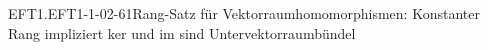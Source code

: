 \begin{PROP}{EFT1.EFT1-1-02-61}{Rang-Satz für Vektorraumhomomorphismen: Konstanter Rang impliziert ker und im sind Untervektorraumbündel}

\end{PROP}
